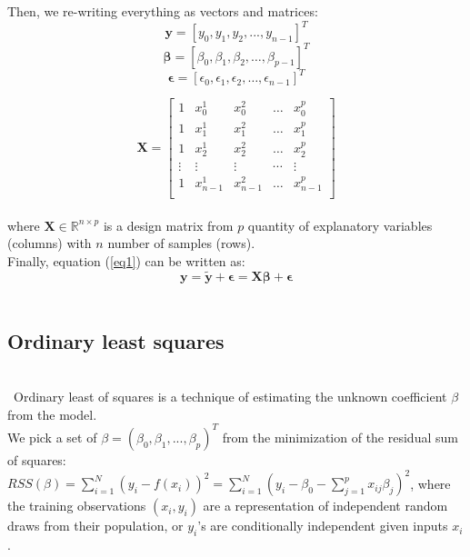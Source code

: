 \documentclass{article}
\begin{document}
Then, we re-writing everything as vectors and matrices:\\

$$\textbf{y} = [y_0,y_1, y_2,..., y_{n-1}]^T$$
$$\boldsymbol{\beta} = [\beta_0,\beta_1, \beta_2,\dots, \beta_{p-1}]^T$$
$$\boldsymbol{\epsilon} = [\epsilon_0,\epsilon_1, \epsilon_2,\dots, \epsilon_{n-1}]^T$$

$$\boldsymbol{X}=
\begin{bmatrix} 
1& x_{0}^1 &x_{0}^2& \dots &x_{0}^{p} \\
1& x_{1}^1 &x_{1}^2& \dots &x_{1}^{p} \\
1& x_{2}^1 &x_{2}^2& \dots &x_{2}^{p} \\                      
\vdots& \vdots &\vdots& \cdots &\vdots \\
1& x_{n-1}^1 &x_{n-1}^2& \dots &x_{n-1}^{p} \\
\end{bmatrix}$$ \\

\noindent where $\textbf{X} \in \mathbb{R}^{n \times p}$ is a design matrix from $p$ quantity of explanatory variables (columns) with $n$ number of samples (rows). \\

Finally, equation (\ref{eq1}) can be written as:\\

\begin{equation}
\label{eq2}
\boldsymbol{y} = \boldsymbol{\tilde{y}} + \boldsymbol{\epsilon} = \boldsymbol{X\beta} + \boldsymbol{\epsilon}
\end{equation}\\

\subsection{Ordinary least squares}\\

\qquad \, Ordinary least of squares is a technique of estimating the unknown coefficient $\beta$ from the model.\\

We pick a set of $\beta=(\beta_0, \beta_1, ..., \beta_p)^T$ from the minimization of the residual sum of squares: $RSS(\beta)=\sum^N_{i=1}(y_i-f(x_i))^2=\sum^N_{i=1}(y_i-\beta_0-\sum^p_{j=1}x_{ij}\beta_j)^2$, where the training observations $(x_i, y_i)$ are a representation of independent random draws from their population, or $y_i$'s are conditionally independent given inputs $x_i$. \\
\end{document}
